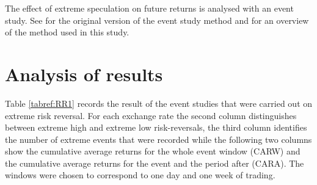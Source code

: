 \documentclass{article}
\begin{document}
The effect of extreme speculation on future returns is analysed with an event study.  See \citet{Dolly1933} for the original version of the event study method and \citet{FamaFisherJensenRoll} for an overview of the method used in this study. 

\section{Analysis of results}
  Table \ref{tabref:RR1} records the result of the event studies that were carried out on extreme risk reversal.   For each exchange rate the second column distinguishes between extreme high and extreme low risk-reversals, the third  column identifies the number of extreme events that were recorded while the following two columns show the cumulative average returns for the whole event window (CARW) and the cumulative average returns for the event and the period after (CARA).  The windows were chosen to correspond to one day and one week of trading.  
\end{document}
